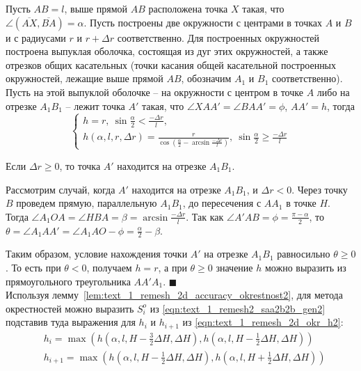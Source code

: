\begin{lemma}\label{lem:text_1_remesh_2d_accuracy_okrestnost2}
Пусть $AB = l$, выше прямой $AB$ расположена точка $X$ такая, что $\angle (\overline{AX}, \overline{BA}) = \alpha$.
Пусть построены две окружности с центрами в точках $A$ и $B$ и с радиусами $r$ и $r + \Delta r$ соответственно.
Для построенных окружностей построена выпуклая оболочка, состоящая из дуг этих окружностей, а также отрезков общих касательных (точки касания общей касательной построенных окружностей, лежащие выше прямой $AB$, обозначим $A_1$ и $B_1$ соответственно).
Пусть на этой выпуклой оболочке -- на окружности с центром в точке $A$ либо на отрезке $A_1B_1$ -- лежит точка $A'$ такая, что $\angle XAA' = \angle BAA' = \phi$, $AA' = h$, тогда 
\begin{equation}
	\begin{cases}\label{eqn:text_1_remesh_2d_okr_h2}
		h = r, \ \sin \frac{\alpha}{2} < \frac{-\Delta r}{l}, \\
		h(\alpha, l, r, \Delta r) = \frac{r}{\cos \left( \frac{\alpha}{2} - \arcsin \frac{-\Delta r}{l} \right)}, \ \sin \frac{\alpha}{2} \ge \frac{-\Delta r}{l}
	\end{cases}
\end{equation}
\end{lemma}

Если $\Delta r \ge 0$, то точка $A'$ находится на отрезке $A_1B_1$.

Рассмотрим случай, когда $A'$ находится на отрезке $A_1B_1$, и $\Delta r < 0$.
Через точку $B$ проведем прямую, параллельную $A_1B_1$, до пересечения с $AA_1$ в точке $H$.
Тогда $\angle A_1OA = \angle HBA = \beta = \arcsin \frac{-\Delta r}{l}$.
Так как $\angle A'AB = \phi = \frac{\pi - \alpha}{2}$, то $\theta = \angle A_1AA' = \angle A_1AO - \phi = \frac{\alpha}{2} - \beta$.

Таким образом, условие нахождения точки $A'$ на отрезке $A_1B_1$ равносильно $\theta \ge 0$.
То есть при $\theta < 0$, получаем $h = r$, а при $\theta \ge 0$ значение $h$ можно выразить из прямоугольного треугольника $AA'A_1$.
$\blacksquare$\\

Используя лемму~\ref{lem:text_1_remesh_2d_accuracy_okrestnost2}, для метода окрестностей можно выразить $S_i^o$ из \eqref{eqn:text_1_remesh2_saa2b2b_gen2} подставив туда выражения для $h_i$ и $h_{i + 1}$ из \eqref{eqn:text_1_remesh_2d_okr_h2}:
\begin{equation}
	\begin{aligned}
	& h_i = \max \left( h \left( \alpha, l, H - \frac{3}{2}\Delta H, \Delta H \right), h \left( \alpha, l, H - \frac{1}{2}\Delta H, \Delta H \right) \right) \\
	& h_{i + 1} = \max \left( h \left( \alpha, l, H - \frac{1}{2}\Delta H, \Delta H \right), h \left( \alpha, l, H + \frac{1}{2}\Delta H, \Delta H \right) \right)
	\end{aligned}
\end{equation}

